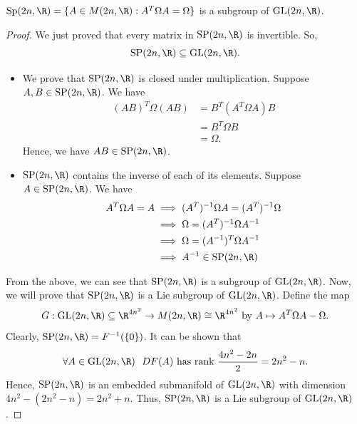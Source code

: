 \begin{eg}
    \( \text{Sp}(2n, \R) = \{ A \in M(2n, \R) : A^{T} \Omega A = \Omega  \}  \) is a subgroup of \( \text{GL}(2n, \R) \).
\end{eg}
\begin{proof}
We just proved that every matrix in \(\text{SP}(2n, \R)\) is invertible. So, 
\[  \text{SP}(2n, \R) \subseteq  \text{GL}(2n, \R). \]

\begin{itemize}
    \item We prove that \( \text{SP}(2n, \R) \) is closed under multiplication. Suppose \( A,B \in \text{SP}(2n, \R)  \).    We have  
        \begin{align*}
            (AB)^{T} \Omega (AB) &= B^{T} (A^{T} \Omega A) B    \\
                                 &= B^{T} \Omega B  \\
                                 &= \Omega.
        \end{align*}
        Hence, we have \( AB \in \text{SP}(2n, \R) \).
    \item \(\text{SP}(2n, \R)\) contains the inverse of each of its elements. Suppose \( A \in \text{SP}(2n, \R) \). We have 
        \begin{align*}
            A^{T} \Omega A = A &\implies (A^{T})^{-1} \Omega A = (A^{T})^{-1} \Omega  \\
                               &\implies  \Omega = (A^{T})^{-1} \Omega A^{-1} \\
                               &\implies \Omega = (A^{-1})^{T} \Omega A^{-1} \\
                               &\implies A^{-1} \in \text{SP}(2n, \R)
        \end{align*}
\end{itemize}
From the above, we can see that \( \text{SP}(2n, \R) \) is a subgroup of \(\text{GL}(2n, \R)\). Now, we will prove that \( \text{SP}(2n, \R) \) is a Lie subgroup of \(\text{GL}(2n, \R)\). Define the map
\[  G: \text{GL}(2n, \R) \subseteq \R^{4 n^{2}} \to M(2n, \R) \cong \R^{4 n^{2}} \ \text{by} \ A \mapsto A^{T} \Omega A - \Omega. \]
Clearly, \( \text{SP}(2n, \R) = F^{-1}(\{ 0 \} ) \). It can be shown that 
\[  \forall A \in \text{GL}(2n, \R) \ \ DF(A) \ \text{has rank } \frac{ 4n^{2} - 2n  }{  2  } = 2 n^{2} -n.  \] 
Hence, \( \text{SP}(2n, \R) \) is an embedded submanifold of \( \text{GL}(2n, \R) \) with dimension \( 4 n^{2} - (2 n^{2} - n) = 2 n^{2} + n  \). Thus, \( \text{SP}(2n, \R) \) is a Lie subgroup of \( \text{GL}(2n, \R)\).
\end{proof}

